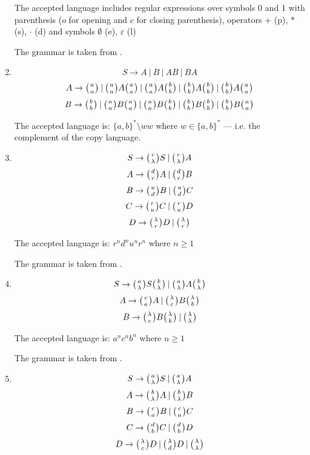 \begin{enumerate}
{    The accepted language includes regular expressions over symbols 0 and 1 with parenthesis ($o$ for opening and $c$ for closing parenthesis), operators $+$ (p), $*$ (s), $\cdot$ (d) and symbols $\emptyset$ (e), $\varepsilon$ (l)

    The grammar is taken from \cite{GRAMMAR_10}.
  }

  \item{
    $$S \rightarrow A \:|\: B \:|\: A B \:|\: B A$$
    $$A \rightarrow \wkpair{a}{a} \:|\: \wkpair{a}{a} A \wkpair{a}{a} \:|\: \wkpair{a}{a} A \wkpair{b}{b} \:|\: \wkpair{b}{b} A \wkpair{b}{b} \:|\: \wkpair{b}{b} A \wkpair{a}{a}$$
    $$B \rightarrow \wkpair{b}{b} \:|\: \wkpair{a}{a} B \wkpair{a}{a} \:|\: \wkpair{a}{a} B \wkpair{b}{b} \:|\: \wkpair{b}{b} B \wkpair{b}{b} \:|\: \wkpair{b}{b} B \wkpair{a}{a}$$

    The accepted language is: $\{a, b\}^* \setminus ww$ where $w \in \{a, b\}^*$ --- i.e. the complement of the copy language.
  }

  \item{
    $$S \rightarrow \wkpair{r}{\lambda} S \:|\: \wkpair{r}{\lambda} A$$
    $$A \rightarrow \wkpair{d}{r} A \:|\: \wkpair{d}{r} B$$
    $$B \rightarrow \wkpair{u}{d} B \:|\: \wkpair{u}{d} C$$
    $$C \rightarrow \wkpair{r}{u} C \:|\: \wkpair{r}{u} D$$
    $$D \rightarrow \wkpair{\lambda}{r} D \:|\: \wkpair{\lambda}{r}$$

    The accepted language is: $r^nd^nu^nr^n$ where $n \geq 1$

    The grammar is taken from \cite{REG_GRAMMAR}.
  }

  \item{
    $$S \rightarrow \wkpair{a}{\lambda} S \wkpair{b}{\lambda} \:|\: \wkpair{a}{\lambda} A \wkpair{b}{\lambda}$$
    $$A \rightarrow \wkpair{c}{a} A \:|\: \wkpair{\lambda}{c} B \wkpair{\lambda}{b}$$
    $$B \rightarrow \wkpair{\lambda}{c} B \wkpair{\lambda}{b} \:|\: \wkpair{\lambda}{\lambda}$$

    The accepted language is: $a^nc^nb^n$ where $n \geq 1$

    The grammar is taken from \cite{WK_GRAMMARS_1}.

  }

  \item{
    $$S \rightarrow \wkpair{a}{\lambda} S \:|\: \wkpair{a}{\lambda} A$$
    $$A \rightarrow \wkpair{b}{\lambda} A \:|\: \wkpair{b}{\lambda} B$$
    $$B \rightarrow \wkpair{c}{a} B \:|\: \wkpair{c}{a} C$$
    $$C \rightarrow \wkpair{d}{b} C \:|\: \wkpair{d}{b} D$$
    $$D \rightarrow \wkpair{\lambda}{c} D \:|\: \wkpair{\lambda}{d} D \:|\: \wkpair{\lambda}{\lambda}$$

}
\end{enumerate}
